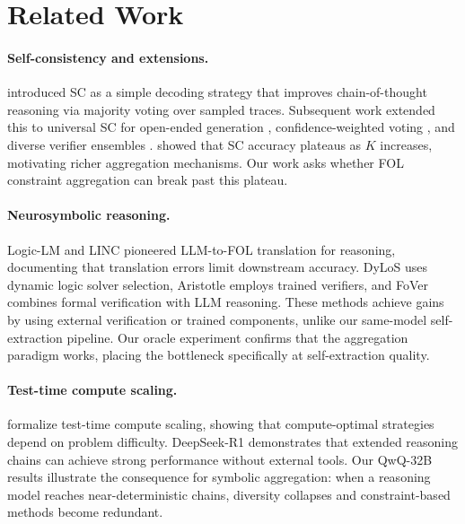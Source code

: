 \documentclass[11pt,a4paper]{article}
\begin{document}
\section{Related Work}

\paragraph{Self-consistency and extensions.}
\citet{wang2023selfconsistency} introduced SC as a simple decoding strategy that improves chain-of-thought reasoning via majority voting over sampled traces. Subsequent work extended this to universal SC for open-ended generation \citep{chen2023usc}, confidence-weighted voting \citep{taubenfeld2025weighted}, and diverse verifier ensembles \citep{li2023diverse}. \citet{loo2025scaling} showed that SC accuracy plateaus as $K$ increases, motivating richer aggregation mechanisms. Our work asks whether FOL constraint aggregation can break past this plateau.

\paragraph{Neurosymbolic reasoning.}
Logic-LM \citep{pan2023logiclm} and LINC \citep{olausson2023linc} pioneered LLM-to-FOL translation for reasoning, documenting that translation errors limit downstream accuracy. DyLoS \citep{dylos2026} uses dynamic logic solver selection, Aristotle \citep{aristotle2025} employs trained verifiers, and FoVer \citep{fover2025} combines formal verification with LLM reasoning. These methods achieve gains by using external verification or trained components, unlike our same-model self-extraction pipeline. Our oracle experiment confirms that the aggregation paradigm works, placing the bottleneck specifically at self-extraction quality.

\paragraph{Test-time compute scaling.}
\citet{snell2025scaling} formalize test-time compute scaling, showing that compute-optimal strategies depend on problem difficulty. DeepSeek-R1 \citep{deepseek2025r1} demonstrates that extended reasoning chains can achieve strong performance without external tools. Our QwQ-32B results illustrate the consequence for symbolic aggregation: when a reasoning model reaches near-deterministic chains, diversity collapses and constraint-based methods become redundant.
\end{document}
